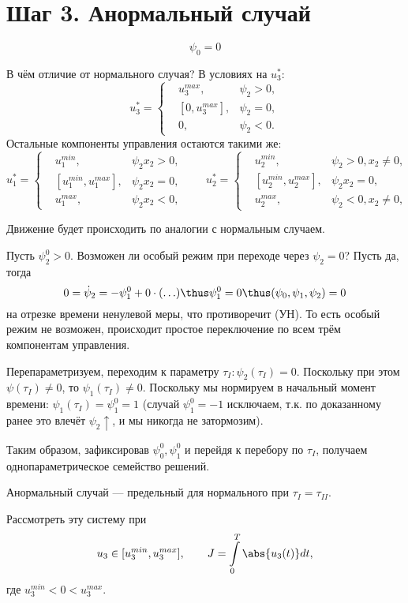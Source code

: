 \section*{Шаг 3. Анормальный случай}
$$
    \psi_0 = 0
$$

В чём отличие от нормального случая? В условиях на $u_3^*$:
$$
    u_3^* = 
        \left\{ 
            \begin{aligned}
                & u_3^{max}, &\psi_2 > 0, \\
                & [0, u_3^{max}], &\psi_2 = 0, \\
                & 0, &\psi_2 < 0.
            \end{aligned} 
        \right.
$$
Остальные компоненты управления остаются такими же:
$$
u_1^* = \left\{ \begin{aligned}
    & u_1^{min}, &\psi_2 x_2 > 0, \\
    & [u_1^{min}, u_1^{max}], &\psi_2 x_2 = 0, \\
    & u_1^{max}, &\psi_2 x_2 < 0,
\end{aligned} \right.
\qquad
u_2^* = \left\{ \begin{aligned}
    & u_2^{min}, &\psi_2 > 0, x_2 \neq 0, \\
    & [u_2^{min}, u_2^{max}], &\psi_2 x_2 = 0, \\
    & u_2^{max}, &\psi_2 < 0, x_2 \neq 0,
\end{aligned} \right.
$$

Движение будет происходить по аналогии с нормальным случаем.

Пусть $\psi_2^0 > 0$. Возможен ли особый режим при переходе через $\psi_2 = 0$? Пусть да, тогда
$$
    0 = \dot{\psi}_2 = -\psi_1^0 + 0 \cdot (\ldots) \thus \psi_1^0 = 0 \thus (\psi_0, \psi_1, \psi_2) = 0
$$
на отрезке времени ненулевой меры, что противоречит (УН). То есть особый режим не возможен, происходит простое переключение по всем трём компонентам управления.

Перепараметризуем, переходим к параметру $\tau_I \colon \psi_2(\tau_I) = 0$. Поскольку при этом $\psi(\tau_I) \neq 0$, то $\psi_1(\tau_I) \neq 0$. Поскольку мы нормируем в начальный момент времени: $\psi_1(\tau_I) = \psi_1^0 = 1$ (случай $\psi_1^0 = -1$ исключаем, т.к. по доказанному ранее это влечёт $\psi_2 \uparrow$, и мы никогда не затормозим).

Таким образом, зафиксировав $\psi_0^0, \psi_1^0$ и перейдя к перебору по $\tau_I$, получаем однопараметрическое семейство решений.

\begin{remark}
    Анормальный случай --- предельный для нормального при $\tau_I = \tau_{II}$.
\end{remark}

\begin{exercise}
    Рассмотреть эту систему при 
    $$
        u_3 \in [u_3^{min}, u_3^{max}], \qquad J = \int\limits_0^T \abs{u_3(t)} dt,
    $$
    где $u_3^{min} < 0 < u_3^{max}$.
\end{exercise}